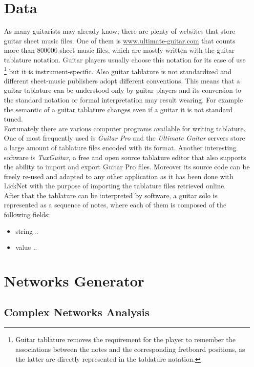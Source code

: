 \documentclass{llncs}
\begin{document}
\section{Data}
As many guitarists may already know, there are plenty of websites that
store guitar sheet music files. One of them is \url{www.ultimate-guitar.com}
that counts more than 800000 sheet music files, which are mostly written
with the guitar tablature notation. Guitar players usually choose this
notation for its ease of use \footnote{Guitar tablature removes the
requirement for the player to remember the associations between the
notes and the corresponding fretboard positions, as the latter are directly
represented in the tablature notation.}
but it is instrument-specific. Also guitar tablature is not standardized and different 
sheet-music publishers adopt different conventions. This means that a
guitar tablature can be understood only by guitar players and its
conversion to the standard notation or formal interpretation may result
wearing. For example the semantic of a guitar tablature changes even if
a guitar it is not standard tuned.\\
Fortunately there are various computer programs available for writing
tablature. One of most frequently used is \emph{Guitar Pro} and the
\emph{Ultimate
Guitar} servers store a large amount of tablature files encoded with its format.
Another interesting software is \emph{TuxGuitar}, a free and open source
tablature editor that also supports the ability to import and export
Guitar Pro files\cite{tuxguitar}. Moreover its source code can be freely
re-used and adapted to any other application as it has been done with
LickNet with the purpose of importing the tablature files retrieved
online.\\
After that the tablature can be interpreted by software, a guitar solo
is represented as a sequence of notes, where each of them is composed
 of the following fields:
\begin{itemize}
\item string ..
\item value ..
\end{itemize}

\section{Networks Generator}
\subsection{Complex Networks Analysis}
\end{document}
